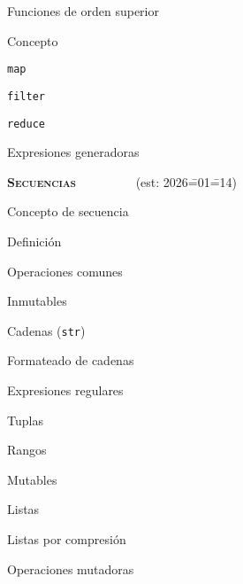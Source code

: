 \begin{longenum}
\begin{longenum}
\begin{longenum}
        \end{longenum}
        \item Funciones de orden superior
        \begin{longenum}
            \item Concepto
            \item \texttt{map}
            \item \texttt{filter}
            \item \texttt{reduce}
            \item Expresiones generadoras
        \end{longenum}
    \end{longenum}
    \item \textbf{\textsc{Secuencias}} \ \ \ \ \ \ \ \ \ (est: 2026\==01\==14)
    \begin{longenum}
        \item Concepto de secuencia
        \begin{longenum}
            \item Definición
            \item Operaciones comunes
        \end{longenum}
        \item Inmutables
        \begin{longenum}
            \item Cadenas (\texttt{str})
            \begin{longenum}
                \item Formateado de cadenas
                \item Expresiones regulares
            \end{longenum}
            \item Tuplas
            \item Rangos
        \end{longenum}
        \item Mutables
        \begin{longenum}
            \item Listas
            \begin{longenum}
                \item Listas por compresión
            \end{longenum}
            \item Operaciones mutadoras
        \end{longenum}
    \end{longenum}

\end{longenum}
